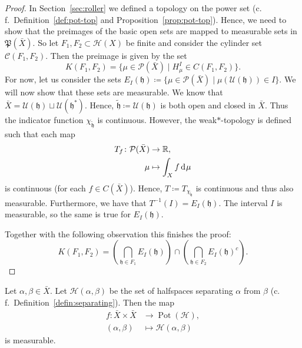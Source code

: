 \begin{proof}
  In Section~\ref{sec:roller} we defined a topology on the power set (c.\,f.\ Definition~\ref{def:pot-top} and Proposition~\ref{prop:pot-top}). Hence, we need to show that the preimages of the basic open sets are mapped to measurable sets in \(\mathfrak{P}(\bar X)\). So let \(F_1, F_2 \subset \mathcal{H}(X)\) be finite and consider the cylinder set \(\mathcal{C}(F_1, F_2)\). Then the preimage is given by the set
  \[
    K(F_1, F_2) = \{\mu \in \mathcal{P}(\bar X) \mid H^I_\mu \in C(F_1, F_2)\}.
  \]
  For now, let us consider the sets \(E_I(\mathfrak{h}) \coloneqq \{\mu \in \mathcal{P}(\bar X) \mid \mu(\mathcal{U}(\mathfrak{h})) \in I\}\). We will now show that these sets are measurable. We know that \(\bar X = \mathcal{U}(\mathfrak{h}) \sqcup \mathcal{U}(\mathfrak{h}^\ast)\). Hence, \(\mathfrak{\tilde h} \coloneqq \mathcal{U}(\mathfrak{h})\) is both open and closed in \(\bar X\). Thus the indicator function \(\chi_{\mathfrak{\tilde h}}\) is continuous. However, the weak\(\ast\)-topology is defined such that each map
  \begin{align*}
    T_f\colon \mathcal{P}(\bar X) &\to \R,\\
    \mu &\mapsto \int_X f \d\mu
  \end{align*}
  is continuous (for each \(f \in C(\bar X)\)). Hence, \(T \coloneqq T_{\chi_{\mathfrak{\tilde h}}}\) is continuous and thus also measurable. Furthermore, we have that \(T^{-1}(I) = E_I(\mathfrak{h})\). The interval \(I\) is measurable, so the same is true for \(E_I(\mathfrak{h})\).

  Together with the following observation this finishes the proof:
  \[
    K(F_1, F_2) = \left (\bigcap_{\mathfrak{h} \in F_1} E_I(\mathfrak{h}) \right ) \cap \left ( \bigcap_{\mathfrak{h} \in F_2} E_I(\mathfrak{h})^{c}\right).
  \]
\end{proof}


\begin{lemma}
  Let \(\alpha, \beta \in \bar X\). Let \(\mathcal{H}(\alpha, \beta)\) be the set of halfspaces separating \(\alpha\) from \(\beta\) (c.\,f.\ Definition~\ref{defin:separating}). Then the map
  \begin{align*}
    f\colon \bar X \times \bar X &\to \operatorname{Pot}(\mathcal{H}),\\
    (\alpha, \beta) &\mapsto \mathcal{H}(\alpha, \beta)
  \end{align*}
  is measurable.
\end{lemma}

